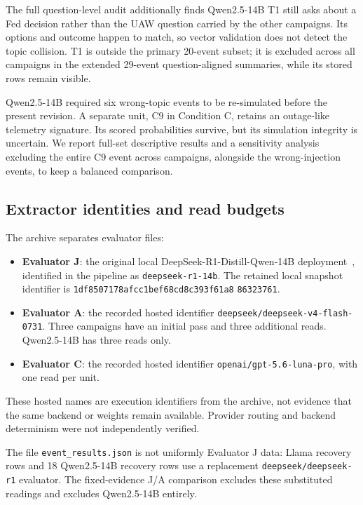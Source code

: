 \documentclass[10pt,conference]{IEEEtran}
\begin{document}
The full question-level audit additionally finds Qwen2.5-14B T1 still asks
about a Fed decision rather than the UAW question carried by the other
campaigns. Its options and outcome happen to match, so vector validation
does not detect the topic collision. T1 is outside the primary 20-event
subset; it is excluded across all campaigns in the extended 29-event
question-aligned summaries, while its stored rows remain visible.

Qwen2.5-14B required six wrong-topic events to be re-simulated before the present
revision. A separate unit, C9 in Condition C, retains an outage-like telemetry
signature. Its scored probabilities survive, but its simulation integrity is
uncertain. We report full-set descriptive results and a sensitivity analysis
excluding the entire C9 event across campaigns, alongside the wrong-injection
events, to keep a balanced comparison.

\subsection{Extractor identities and read budgets}
\label{sec:evaluators}
The archive separates evaluator files:
\begin{itemize}
\item \textbf{Evaluator J}: the original local DeepSeek-R1-Distill-Qwen-14B
deployment~\cite{deepseekr1,deepseekcard}, identified in the pipeline as
\texttt{deepseek-r1-14b}. The retained local snapshot identifier is
\texttt{1df8507178afcc1b}\allowbreak\texttt{ef68cd8c393f61a8}\allowbreak
\texttt{86323761}.
\item \textbf{Evaluator A}: the recorded hosted identifier
\texttt{deepseek/deepseek-v4-flash-0731}. Three campaigns have an initial
pass and three additional reads. Qwen2.5-14B has three reads only.
\item \textbf{Evaluator C}: the recorded hosted identifier
\texttt{openai/gpt-5.6-luna-pro}, with one read per unit.
\end{itemize}
These hosted names are execution identifiers from the archive, not evidence
that the same backend or weights remain available. Provider routing and
backend determinism were not independently verified.

The file \texttt{event\_results.json} is not uniformly Evaluator J data:
Llama recovery rows and 18 Qwen2.5-14B recovery rows use a replacement
\texttt{deepseek/deepseek-r1} evaluator. The fixed-evidence J/A comparison
excludes these substituted readings and excludes Qwen2.5-14B entirely.
\end{document}
